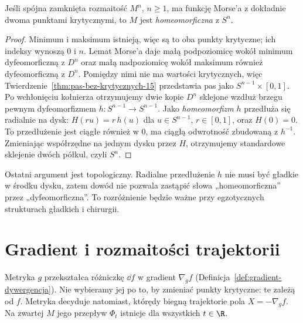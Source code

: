 \begin{twierdzenie}
\label{thm:reeb-morse-17}
Jeśli spójna zamknięta rozmaitość
$M^n$, $n\geq1$, ma funkcję
Morse'a z dokładnie dwoma
punktami krytycznymi, to
$M$ jest \emph{homeomorficzna}
z $S^n$.
\end{twierdzenie}
\begin{proof}
Minimum i maksimum istnieją,
więc są to oba punkty krytyczne;
ich indeksy wynoszą $0$ i $n$.
Lemat Morse'a daje małą
podpoziomicę wokół minimum
dyfeomorficzną z $D^n$ oraz
małą nadpoziomicę wokół maksimum
również dyfeomorficzną z $D^n$.
Pomiędzy nimi nie ma wartości
krytycznych, więc
Twierdzenie~\ref{thm:pas-bez-krytycznych-15}
przedstawia pas jako
$S^{n-1}\times[0,1]$.
Po wchłonięciu kołnierza
otrzymujemy dwie kopie $D^n$
sklejone wzdłuż brzegu
pewnym dyfeomorfizmem
$h:S^{n-1}\to S^{n-1}$.
Jako \emph{homeomorfizm}
$h$ przedłuża się radialnie
na dysk:
$H(ru)=r\,h(u)$ dla
$u\in S^{n-1}$, $r\in[0,1]$,
oraz $H(0)=0$.
To przedłużenie jest ciągłe
również w $0$, ma ciągłą
odwrotność zbudowaną z $h^{-1}$.
Zmieniając współrzędne
na jednym dysku przez $H$,
otrzymujemy standardowe
sklejenie dwóch półkul,
czyli $S^n$.
\end{proof}

\begin{uwaga}
Ostatni argument jest topologiczny.
Radialne przedłużenie $h$ nie musi być
gładkie w środku dysku, zatem dowód
nie pozwala zastąpić słowa
„homeomorficzna” przez
„dyfeomorficzna”. To rozróżnienie
będzie ważne przy egzotycznych
strukturach gładkich i chirurgii.
\end{uwaga}

\section{Gradient i rozmaitości trajektorii}
\label{sec:gradient-morse-17}

Metryka $g$ przekształca różniczkę
$\dd f$ w gradient $\nabla_g f$
(Definicja~\ref{def:gradient-dywergencja}).
Nie wybieramy jej po to, by zmieniać
punkty krytyczne: te zależą od $f$.
Metryka decyduje natomiast, którędy
biegną trajektorie pola
$X=-\nabla_g f$.
Na zwartej $M$ jego przepływ
$\Phi_t$ istnieje dla wszystkich
$t\in\R$.

